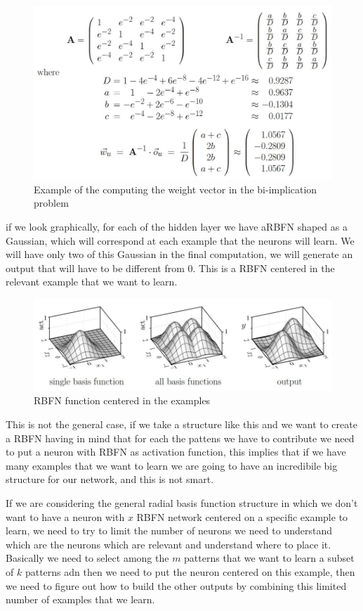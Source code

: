 \documentclass{article}
\begin{document}
\begin{figure}
    \centering
    \includegraphics[scale=0.4]{images/example_biimp_rbfn.png}
    \caption{Example of the computing the weight vector in the bi-implication problem}
\end{figure}
if we look graphically, for each of the hidden layer we have aRBFN shaped as a Gaussian,
which will correspond at each example that the neurons will learn. We will have only
two of this Gaussian in the final computation, we will generate an output that will
have to be different from $0$. This is a RBFN centered in the relevant example that
we want to learn.

\begin{figure}
    \centering
    \includegraphics[scale=0.4]{images/rbfn_gauss.png}
    \caption{RBFN function centered in the examples}
\end{figure}

This is not the general case, if we take a structure like this and we want to create
a RBFN having in mind that for each the pattens we have to contribute we need to put a neuron
with RBFN as activation function, this implies that if we have many examples that we want to learn
we are going to have an incredibile big structure for our network, and this is not smart.

If we are considering the general radial basis function structure in which we don't want to have a neuron with $x$
RBFN network centered on a specific example to learn, we need to try to limit the number of neurons
we need to understand which are the neurons which are relevant and understand where to place it.
Basically we need to select among the $m$ patterns that we want to learn a subset of $k$ patterns
adn then we need to put the neuron centered on this example, then we need to figure out how to build
the other outputs by combining this limited number of examples that we learn.
\end{document}
